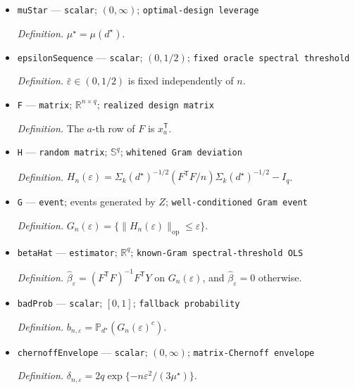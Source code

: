 \documentclass{article}
\begin{document}
\begin{itemize}
  \par\smallskip\noindent\emph{Definition.} \(\mu(d)=\max_{z\in\{0,1\}^p}\phi(2z-\mathbf 1_p)^{\mathsf T}\Sigma_k(d)^{-1}\phi(2z-\mathbf 1_p)\).
  \item \texttt{muStar} --- \texttt{scalar}; \((0,\infty)\); \texttt{optimal-\allowbreak{}design leverage}
  \par\smallskip\noindent\emph{Definition.} \(\mu^\star=\mu(d^\star)\).
  \item \texttt{epsilonSequence} --- \texttt{scalar}; \((0,1/2)\); \texttt{fixed oracle spectral threshold}
  \par\smallskip\noindent\emph{Definition.} \(\bar\varepsilon\in(0,1/2)\) is fixed independently of \(n\).
  \item \texttt{F} --- \texttt{matrix}; \(\mathbb R^{n\times q}\); \texttt{realized design matrix}
  \par\smallskip\noindent\emph{Definition.} The \(a\)-th row of \(F\) is \(x_a^{\mathsf T}\).
  \item \texttt{H} --- \texttt{random matrix}; \(\mathbb S^q\); \texttt{whitened Gram deviation}
  \par\smallskip\noindent\emph{Definition.} \(H_n(\varepsilon)=\Sigma_k(d^\star)^{-1/2}(F^{\mathsf T}F/n)\Sigma_k(d^\star)^{-1/2}-I_q\).
  \item \texttt{G} --- \texttt{event}; events generated by \(Z\); \texttt{well-\allowbreak{}conditioned Gram event}
  \par\smallskip\noindent\emph{Definition.} \(G_n(\varepsilon)=\{\|H_n(\varepsilon)\|_{\mathrm{op}}\le\varepsilon\}\).
  \item \texttt{betaHat} --- \texttt{estimator}; \(\mathbb R^q\); \texttt{known-\allowbreak{}Gram spectral-\allowbreak{}threshold OLS}
  \par\smallskip\noindent\emph{Definition.} \(\widehat\beta_{\varepsilon}=(F^{\mathsf T}F)^{-1}F^{\mathsf T}Y\) on \(G_n(\varepsilon)\), and \(\widehat\beta_{\varepsilon}=0\) otherwise.
  \item \texttt{badProb} --- \texttt{scalar}; \([0,1]\); \texttt{fallback probability}
  \par\smallskip\noindent\emph{Definition.} \(b_{n,\varepsilon}=\mathbb P_{d^\star}(G_n(\varepsilon)^c)\).
  \item \texttt{chernoffEnvelope} --- \texttt{scalar}; \((0,\infty)\); \texttt{matrix-\allowbreak{}Chernoff envelope}
  \par\smallskip\noindent\emph{Definition.} \(\delta_{n,\varepsilon}=2q\exp\{-n\varepsilon^2/(3\mu^\star)\}\).

\end{itemize}
\end{document}
